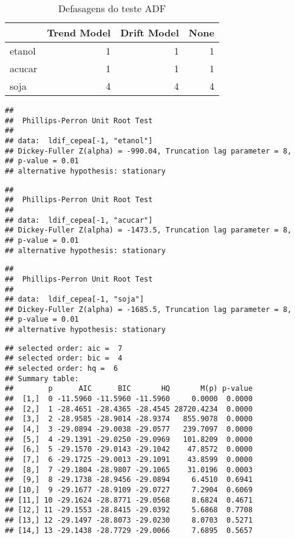 \documentclass[]{article}
\begin{document}
\begin{longtable}[t]{lrrr}
\caption{\label{tab:ADF e KPSS logdif}Defasagens do teste ADF}\\
\toprule
  & Trend Model & Drift Model & None\\
\midrule
etanol & 1 & 1 & 1\\
acucar & 1 & 1 & 1\\
soja & 4 & 4 & 4\\
\bottomrule
\end{longtable}

\begin{verbatim}
## 
##  Phillips-Perron Unit Root Test
## 
## data:  ldif_cepea[-1, "etanol"]
## Dickey-Fuller Z(alpha) = -990.04, Truncation lag parameter = 8,
## p-value = 0.01
## alternative hypothesis: stationary
\end{verbatim}

\begin{verbatim}
## 
##  Phillips-Perron Unit Root Test
## 
## data:  ldif_cepea[-1, "acucar"]
## Dickey-Fuller Z(alpha) = -1473.5, Truncation lag parameter = 8,
## p-value = 0.01
## alternative hypothesis: stationary
\end{verbatim}

\begin{verbatim}
## 
##  Phillips-Perron Unit Root Test
## 
## data:  ldif_cepea[-1, "soja"]
## Dickey-Fuller Z(alpha) = -1685.5, Truncation lag parameter = 8,
## p-value = 0.01
## alternative hypothesis: stationary
\end{verbatim}

\begin{verbatim}
## selected order: aic =  7 
## selected order: bic =  4 
## selected order: hq =  6 
## Summary table:  
##        p      AIC      BIC       HQ       M(p) p-value
##  [1,]  0 -11.5960 -11.5960 -11.5960     0.0000  0.0000
##  [2,]  1 -28.4651 -28.4365 -28.4545 28720.4234  0.0000
##  [3,]  2 -28.9585 -28.9014 -28.9374   855.9078  0.0000
##  [4,]  3 -29.0894 -29.0038 -29.0577   239.7097  0.0000
##  [5,]  4 -29.1391 -29.0250 -29.0969   101.8209  0.0000
##  [6,]  5 -29.1570 -29.0143 -29.1042    47.8572  0.0000
##  [7,]  6 -29.1725 -29.0013 -29.1091    43.8599  0.0000
##  [8,]  7 -29.1804 -28.9807 -29.1065    31.0196  0.0003
##  [9,]  8 -29.1738 -28.9456 -29.0894     6.4510  0.6941
## [10,]  9 -29.1677 -28.9109 -29.0727     7.2904  0.6069
## [11,] 10 -29.1624 -28.8771 -29.0568     8.6824  0.4671
## [12,] 11 -29.1553 -28.8415 -29.0392     5.6868  0.7708
## [13,] 12 -29.1497 -28.8073 -29.0230     8.0703  0.5271
## [14,] 13 -29.1438 -28.7729 -29.0066     7.6895  0.5657
\end{verbatim}
\end{document}
